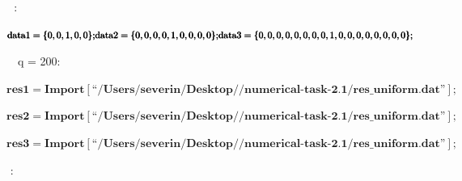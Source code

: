 \documentclass{article}
\newcommand{\unicode}[1]{{}}
\begin{document}
$\unicode{0412}\unicode{043e}\unicode{0437}\unicode{044c}\unicode{043c}\unicode{0435}\unicode{043c}$ $\unicode{0441}\unicode{043b}\unicode{0435}\unicode{0434}\unicode{0443}\unicode{044e}\unicode{0449}\unicode{0438}\unicode{0435}$
$\unicode{0434}\unicode{0430}\unicode{043d}\unicode{043d}\unicode{044b}\unicode{0435}$:

\begin{doublespace}
\noindent\(\pmb{\text{data1} = \{0, 0, 1, 0, 0\};}\\
\pmb{\text{data2} = \{0, 0, 0, 0, 1, 0, 0, 0, 0\};}\\
\pmb{\text{data3} =\{0, 0, 0, 0, 0, 0, 0, 0, 1, 0, 0, 0, 0, 0, 0, 0, 0\};}\)
\end{doublespace}

$\unicode{0417}\unicode{0430}\unicode{043f}\unicode{0443}\unicode{0441}\unicode{0442}\unicode{0438}\unicode{043c}$ $\unicode{043f}\unicode{0440}\unicode{043e}\unicode{0433}\unicode{0440}\unicode{0430}\unicode{043c}\unicode{043c}\unicode{0443}$
$\unicode{0434}\unicode{043b}\unicode{044f}$ q = 200:

\begin{doublespace}
\noindent\(\pmb{\text{res1} = \text{Import}[\text{{``}/Users/severin/Desktop/$\unicode{041f}\unicode{0440}\unicode{0430}\unicode{043a}\unicode{0442}\unicode{0438}\unicode{043a}\unicode{0443}\unicode{043c}$/numerical-task-2.1/res$\_$uniform.dat{''}}];}\)
\end{doublespace}

\begin{doublespace}
\noindent\(\pmb{\text{res2} = \text{Import}[\text{{``}/Users/severin/Desktop/$\unicode{041f}\unicode{0440}\unicode{0430}\unicode{043a}\unicode{0442}\unicode{0438}\unicode{043a}\unicode{0443}\unicode{043c}$/numerical-task-2.1/res$\_$uniform.dat{''}}];}\)
\end{doublespace}

\begin{doublespace}
\noindent\(\pmb{\text{res3} = \text{Import}[\text{{``}/Users/severin/Desktop/$\unicode{041f}\unicode{0440}\unicode{0430}\unicode{043a}\unicode{0442}\unicode{0438}\unicode{043a}\unicode{0443}\unicode{043c}$/numerical-task-2.1/res$\_$uniform.dat{''}}];}\)
\end{doublespace}

$\unicode{041f}\unicode{043e}\unicode{0441}\unicode{0442}\unicode{0440}\unicode{043e}\unicode{0438}\unicode{043c}$ $\unicode{0433}\unicode{0440}\unicode{0430}\unicode{0444}\unicode{0438}\unicode{043a}\unicode{0438}$:
\end{document}
